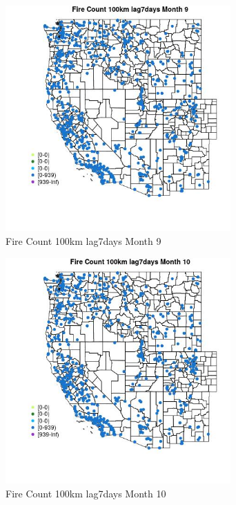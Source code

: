 \begin{figure} 
\centering  
\includegraphics[width=0.77\textwidth]{Code_Outputs/Report_ML_input_PM25_Step4_part_e_de_duplicated_aves_compiled_2019-05-21wNAs_MapObsMo9Fire_Count_100km_lag7days.jpg} 
\caption{\label{fig:Report_ML_input_PM25_Step4_part_e_de_duplicated_aves_compiled_2019-05-21wNAsMapObsMo9Fire_Count_100km_lag7days}Fire Count 100km lag7days Month 9} 
\end{figure} 
 

\begin{figure} 
\centering  
\includegraphics[width=0.77\textwidth]{Code_Outputs/Report_ML_input_PM25_Step4_part_e_de_duplicated_aves_compiled_2019-05-21wNAs_MapObsMo10Fire_Count_100km_lag7days.jpg} 
\caption{\label{fig:Report_ML_input_PM25_Step4_part_e_de_duplicated_aves_compiled_2019-05-21wNAsMapObsMo10Fire_Count_100km_lag7days}Fire Count 100km lag7days Month 10} 
\end{figure} 
 

